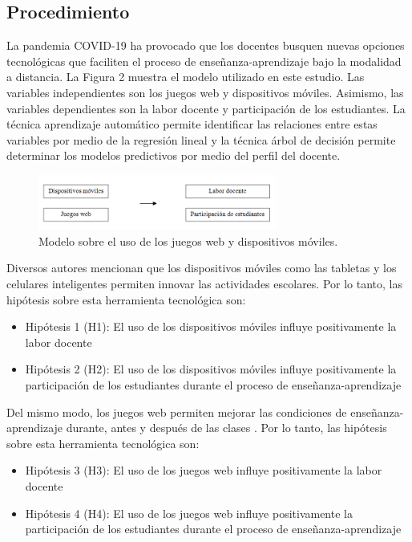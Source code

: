 \documentclass[spanish]{textolivre}
\begin{document}
\subsection{Procedimiento}
La pandemia COVID-19 ha provocado que los docentes busquen nuevas opciones tecnológicas que faciliten el proceso de enseñanza-aprendizaje bajo la modalidad a distancia. La Figura 2 muestra el modelo utilizado en este estudio. Las variables independientes son los juegos web y dispositivos móviles. Asimismo, las variables dependientes son la labor docente y participación de los estudiantes. La técnica aprendizaje automático permite identificar las relaciones entre estas variables por medio de la regresión lineal y la técnica árbol de decisión permite determinar los modelos predictivos por medio del perfil del docente.

\begin{figure}[htbp]
 \centering
 \includegraphics[width=0.7\textwidth]{37074-pag2.png}
 \caption{Modelo sobre el uso de los juegos web y dispositivos móviles.}
 \label{fig2}
\end{figure}

Diversos autores \cite[p. ej.]{gezgin2018, li2019, padmo2019, sumuer2021} mencionan que los dispositivos móviles como las tabletas y los celulares inteligentes permiten innovar las actividades escolares. Por lo tanto, las hipótesis sobre esta herramienta tecnológica son:

\begin{itemize}
    \item Hipótesis 1 (H1): El uso de los dispositivos móviles influye positivamente la labor docente 
    \item Hipótesis 2 (H2): El uso de los dispositivos móviles influye positivamente la participación de los estudiantes durante el proceso de enseñanza-aprendizaje
\end{itemize}

Del mismo modo, los juegos web permiten mejorar las condiciones de enseñanza-aprendizaje durante, antes y después de las clases \cite{de_la_pena_esteban2020, ypsilanti2014}. Por lo tanto, las hipótesis sobre esta herramienta tecnológica son:

\begin{itemize}
    \item Hipótesis 3 (H3): El uso de los juegos web influye positivamente la labor docente 
    \item Hipótesis 4 (H4): El uso de los juegos web influye positivamente la participación de los estudiantes durante el proceso de enseñanza-aprendizaje 
\end{itemize}
\end{document}
